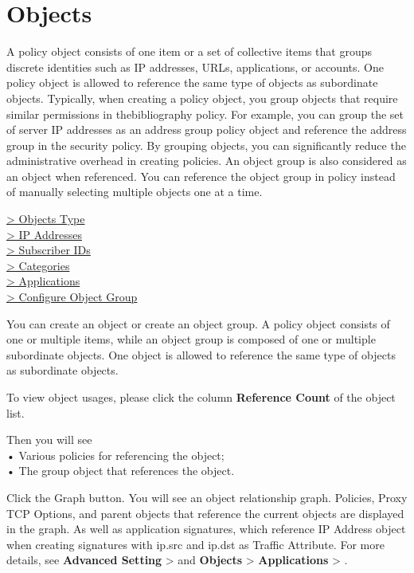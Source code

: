 %
\chapter*{\hypertarget{link:Objects}{Objects}}
\label{sec:objects}

A policy object consists of one item or a set of collective items that groups discrete identities such as IP addresses, URLs, applications, or accounts. 
One policy object is allowed to reference the same type of objects as subordinate objects. Typically, when creating a policy object, you group objects that require similar permissions in thebibliography policy. 
For example, you can group the set of server IP addresses as an address group policy object and reference the address group in the security policy. By grouping objects, 
you can significantly reduce the administrative overhead in creating policies. An object group is also considered as an object when referenced. 
You can reference the object group in policy instead of manually selecting multiple objects one at a time.

{
\color{linkblue}
\hyperlink{link:Objects Type}{> Objects Type} \\
\hyperlink{link:IP Addresses}{> IP Addresses} \\
\hyperlink{link:Subscriber IDs}{> Subscriber IDs}\\
\hyperlink{link:Categories}{> Categories}\\
\hyperlink{link:Applications}{> Applications}\\
\hyperlink{link:Configure Object Group}{> Configure Object Group}\\
}
\clearpage

You can create an object or create an object group. A policy object consists of one or multiple items, while an object group is composed of one or multiple subordinate objects. 
One object is allowed to reference the same type of objects as subordinate objects. 


To view object usages, please click the column \textbf{Reference Count} of the object list.


Then you will see\\
• Various policies for referencing the object; \\
• The group object that references the object.


Click the Graph button. You will see an object relationship graph. Policies, Proxy TCP Options, and parent objects that reference the current objects are displayed in the graph. 
As well as application signatures, which reference IP Address object when creating signatures with ip.src and ip.dst as Traffic Attribute. 
For more details, see \textbf{Advanced Setting} > \textbf{\hyperlink{link:Proxy TCP Option}{\color{linkblue}{Proxy TCP Option}}} and \textbf{Objects} > \textbf{Applications} > \textbf{\hyperlink{link:Signatures}{\color{linkblue}{Signatures}}}. 


